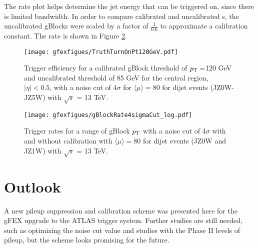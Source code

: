 The rate plot helps determine the jet energy that can be triggered on, since there is limited bandwidth.  In order to compare calibrated and uncalibrated \pt s, the uncalibrated gBlocks were scaled by a factor of $\frac{1}{0.6}$ to approximate a calibration constant.  The rate is shown in Figure \ref{fig:gBlockRates}.\\


\begin{figure}[h!]
  \centering
	\texttt{[image: gfexfigues/TruthTurnOnPt120GeV.pdf]}
\caption[gBlock trigger efficiencies]{\label{fig:gBlockTurnOn}{Trigger efficiency for a calibrated gBlock threshold of $p_{\mathrm{T}}=$120 GeV and uncalibrated threshold of 85 GeV for the central region, $|\eta|<0.5$, with a noise cut of 4$\sigma$ for $\langle \mu \rangle = 80$ for dijet events (JZ0W-JZ5W) with $\sqrt{s}$ = 13 TeV.  }} 
\end{figure}

\begin{figure}[h!]
  \centering
	\texttt{[image: gfexfigues/gBlockRate4sigmaCut\_log.pdf]}
\caption[gBlock Trigger Rates]{\label{fig:gBlockRates}{Trigger rates for a range of gBlock $p_{\mathrm{T}}$ with a noise cut of 4$\sigma$ with and without calibration with $\langle \mu \rangle = 80$ for dijet events (JZ0W and JZ1W) with $\sqrt{s}$ = 13 TeV.}} 
\end{figure}





\section{Outlook}

A new pileup suppression and calibration scheme was presented here for the gFEX upgrade to the ATLAS trigger system.  Further studies are still needed, such as optimizing the noise cut value and studies with the Phase II levels of pileup, but the scheme looks promising for the future.







